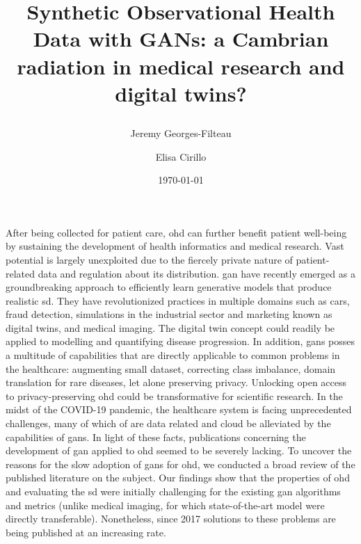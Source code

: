 \documentclass[10pt]{article}
\renewenvironment{abstract}
 {{\bfseries\noindent{\abstractname}\par\nobreak}\footnotesize}
 {\bigskip}
\begin{document}
    

    \title{Synthetic Observational Health Data with GANs: a Cambrian radiation in medical research and digital twins?\par
    \color{gray}{\big Probably, reproducing in the blockchain, ready to simulate you in the  next pandemic ready }}
 
    
    \author[1,2]{Jeremy Georges-Filteau}%
    \author[2]{Elisa Cirillo}%


    \vspace{-1em}

    \date{\today}

    \begingroup
    \let\center\flushleft
    \let\endcenter\endflushleft
    \maketitle
    \endgroup


    \glsresetall
    \begin{abstract}
    After being collected for patient care, \gls{ohd} can further benefit patient well-being by sustaining the development of health informatics and medical research. Vast potential is largely unexploited due to the fiercely private nature of patient-related data and regulation about its distribution. \gls{gan} have recently emerged as a groundbreaking approach to efficiently learn generative models that produce realistic \gls{sd}. They have revolutionized practices in multiple domains such as 
     cars, fraud detection, simulations in the industrial sector and marketing known as digital twins, and medical imaging. The digital twin concept could readily be applied to modelling and quantifying disease progression. In addition, \glspl{gan} posses a multitude of capabilities that are directly applicable to common problems in the healthcare: augmenting small dataset, correcting class imbalance, domain translation for rare diseases, let alone preserving privacy. Unlocking open access to privacy-preserving \gls{ohd} could be transformative for scientific research. In the midst of the COVID-19 pandemic, the healthcare system is facing unprecedented challenges, many of which of are data related and cloud be alleviated by the capabilities of \glspl{gan}. In light of these facts, publications concerning the development of  \gls{gan} applied to \gls{ohd} seemed to be severely lacking. To uncover the reasons for the slow adoption of \glspl{gan} for \gls{ohd}, we conducted a broad review of the published literature on the subject. Our findings show that the properties of \gls{ohd} and evaluating the \gls{sd} were initially challenging for the existing \gls{gan} algorithms and metrics (unlike medical imaging, for which state-of-the-art model were directly transferable). Nonetheless, since 2017 solutions to these problems are being published at an increasing rate.
    \end{abstract}

    
    
    
    
    
    

    \pagebreak

    \printglossary[type=oalgo]
    \printglossary[type=\acronymtype]

    \pagebreak

    
\end{document}
